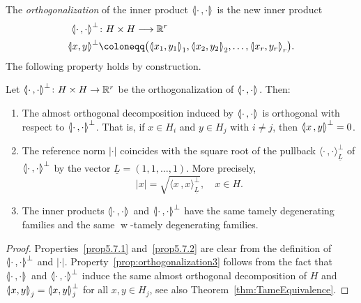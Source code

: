 \documentclass[AHL,Unicode,longabstracts]{cedram}
\newcommand{\llangle}{\mathopen{\langle\mkern -3.1mu\lvert}}
\newcommand{\rrangle}{\mathclose{\rvert\mkern -3.1mu\rangle}}
\newcommand{\highinn}[2]{{\llangle#2\rrangle_{#1}}}
\newcommand{\highinnoneorth}[2]{{\llangle#2\rrangle^{\perp}_{#1}}}
\newcommand{\innoneorth}[2]{{\langle#2\rangle^{\perp}_{#1}}}
\newcommand{\refnorm}[1]{\lvert#1\rvert}
\DeclareMathOperator{\weak}{w}
\newcommand{\R}{\mathbb{R}}
\renewcommand*{\to}{\mathchoice{\longrightarrow}{\rightarrow}{\rightarrow}{\rightarrow}}
\newcommand*{\relabel}{\renewcommand{\labelenumi}{(\theenumi)}}
\newcommand*{\romanenumi}{\renewcommand*{\theenumi}{\roman{enumi}}\relabel}
\begin{document}
The \emph{orthogonalization} of the inner product $\highinn{}{\cdot\,,\cdot}$ is the new inner product
\begin{align*}
\highinnoneorth{}{\cdot\,,\cdot} &\colon H \times H \to \R^r\\
\highinnoneorth{}{x,y} &\coloneqq \bigl(\highinn{1}{x_1, y_1},\highinn{2}{x_2, y_2}, \dots, \highinn{r}{x_r, y_r} \bigr).
\end{align*}
The following property holds by construction.

\begin{prop}\label{prop:orthogonalization}
Let $\highinnoneorth{}{\cdot\,,\cdot} \colon H \times H \to \R^r$ be the orthogonalization of $\highinn{}{\cdot\,,\cdot}$. Then:
\begin{enumerate}\romanenumi
\item\label{prop5.7.1} The almost orthogonal decomposition induced by $\highinn{}{\cdot\,,\cdot}$ is orthogonal with respect to $\highinnoneorth{}{\cdot\,,\cdot}$. That is, if $x \in H_i$ and $y \in H_j$ with $i \neq j$, then $\highinnoneorth{}{x\,,y} = 0$.
\item\label{prop5.7.2} The reference norm $\refnorm{\cdot}$ coincides with the square root of the pullback $\innoneorth{\underline L}{\cdot\,,\cdot}$ of $\highinnoneorth{}{\cdot\,,\cdot}$ by the vector $\underline L = (1, 1, \dots, 1)$. More precisely,
\[
\refnorm{x} = \sqrt{\innoneorth{\underline L}{x\,,x}}, \quad x \in H.
\]
\item \label{prop:orthogonalization3}
The inner products $\highinn{}{\cdot\,,\cdot}$ and $\highinnoneorth{}{\cdot\,,\cdot}$ have the same tamely degenerating families and the same $\weak$-tamely degenerating families.
\end{enumerate}
\end{prop}

\begin{proof}
Properties~\eqref{prop5.7.1} and~\eqref{prop5.7.2} are clear from the definition of $\highinnoneorth{}{\cdot\,,\cdot}$ and $\refnorm{\cdot}$. Property~\eqref{prop:orthogonalization3} follows from the fact that $\highinn{}{\cdot\,,\cdot}$ and $\highinnoneorth{}{\cdot\,,\cdot}$ induce the same almost orthogonal decomposition of $H$ and $\highinn{j}{x,y} = \highinnoneorth{j}{x,y}$ for all $x,y \in H_j$, see also Theorem~\ref{thm:TameEquivalence}.
\end{proof}
\end{document}

